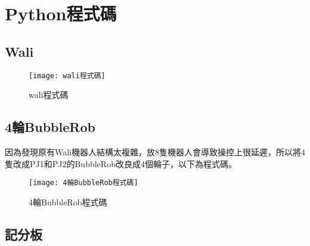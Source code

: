 \chapter{Python程式碼}
\section{Wali}
\begin{figure}[!ht]
\centering
\texttt{[image: wali程式碼]}
\caption{\Large wali程式碼}
\label{wali程式碼}
\end{figure}

\section{4輪BubbleRob}
因為發現原有Wali機器人結構太複雜，放8隻機器人會導致操控上很延遲，所以將4隻改成PJ1和PJ2的BubbleRob改良成4個輪子，以下為程式碼。\\

\begin{figure}[!ht]
\centering
\texttt{[image: 4輪BubbleRob程式碼]}
\caption{\Large 4輪BubbleRob程式碼}
\label{4輪BubbleRob程式碼}
\end{figure}

\section{記分板}

\newpage
